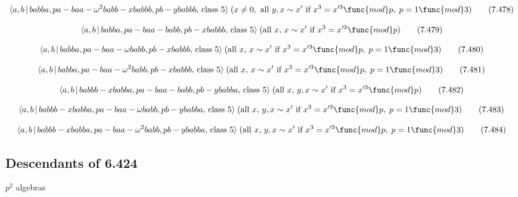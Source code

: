 \documentclass[10pt]{article}
\begin{document}
\begin{equation}
\langle a,b\,|\,babba,pa-baa-\omega ^{2}babb-xbabbb,pb-ybabbb,\,\text{class }%
5\rangle \;(x\neq 0,\text{ all }y,x \sim x^{\prime }\text{ if }x^3=x^{\prime
3}\func{mod}p,\;p=1\func{mod}3)  \tag{7.478}
\end{equation}

\begin{equation}
\langle a,b\,|\,babba,pa-baa-babb,pb-xbabbb,\,\text{class }5\rangle \;(\text{%
all }x,\,x \sim x^{\prime }\text{ if }x^3=x^{\prime 3}\func{mod}p) 
\tag{7.479}
\end{equation}

\begin{equation}
\langle a,b\,|\,babba,pa-baa-\omega babb,pb-xbabbb,\,\text{class }5\rangle
\;(\text{all }x,\,x \sim x^{\prime }\text{ if }x^3=x^{\prime 3}\func{mod}%
p,\;p=1\func{mod}3)  \tag{7.480}
\end{equation}

\begin{equation}
\langle a,b\,|\,babba,pa-baa-\omega ^{2}babb,pb-xbabbb,\,\text{class }%
5\rangle \;(\text{all }x,\,x \sim x^{\prime }\text{ if }x^3=x^{\prime 3}%
\func{mod}p,\;p=1\func{mod}3)  \tag{7.481}
\end{equation}

\begin{equation}
\langle a,b\,|\,babbb-xbabba,pa-baa-babb,pb-ybabba,\,\text{class }5\rangle
\;(\text{all }x,\,y,x \sim x^{\prime }\text{ if }x^3=x^{\prime 3}\func{mod}p)
\tag{7.482}
\end{equation}

\begin{equation}
\langle a,b\,|\,babbb-xbabba,pa-baa-\omega babb,pb-ybabba,\,\text{class }%
5\rangle \;(\text{all }x,\,y,x \sim x^{\prime }\text{ if }x^3=x^{\prime 3}%
\func{mod}p,\;p=1\func{mod}3)  \tag{7.483}
\end{equation}

\begin{equation}
\langle a,b\,|\,babbb-xbabba,pa-baa-\omega ^{2}babb,pb-ybabba,\,\text{class }%
5\rangle \;(\text{all }x,\,y,x \sim x^{\prime }\text{ if }x^3=x^{\prime 3}%
\func{mod}p,\;p=1\func{mod}3)  \tag{7.484}
\end{equation}

\subsection{Descendants of 6.424}

$p^{2}$ algebras
\end{document}
